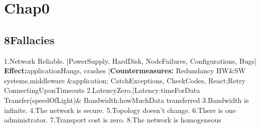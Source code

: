 \section{Chap0}
\subsection*{8Fallacies}
1.Network Reliable. |PowerSupply, HardDisk, NodeFailures, Configurations, Bugs| \textbf{Effect:}applicationHangs, crashes |\textbf{Countermeasures:} Redundancy HW\&SW systems,middleware \&application; CatchExceptions, CheckCodes, React;Retry ConnectingUponTimeouts
2.LatencyZero.|Latency:timeForData Transfer(speedOfLight)\& Bandwidth:howMuchData transferred
3.Bandwidth is infinite.
4.The network is secure.
5.Topology doesn't change.
6.There is one administrator.
7.Transport cost is zero.
8.The network is homogeneous


